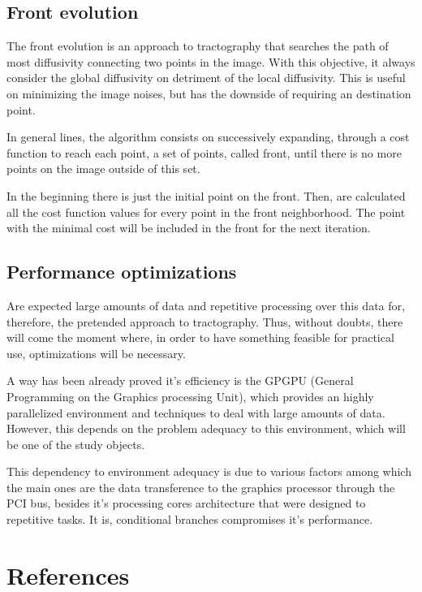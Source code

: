 \documentclass[a4paper,11pt]{report}
\begin{document}
  \section{Front evolution}
  The front evolution is an approach to tractography that searches the path of most diffusivity connecting two points in the image. With this objective, it always consider the global diffusivity on detriment of the local diffusivity. This is useful on minimizing the image noises, but has the downside of requiring an destination point.

  In general lines, the algorithm consists on successively expanding, through a cost function to reach each point, a set of points, called front, until there is no more points on the image outside of this set.

  In the beginning there is just the initial point on the front. Then, are calculated all the cost function values for every point in the front neighborhood. The point with the minimal cost will be included in the front for the next iteration.

  \section{Performance optimizations}
  Are expected large amounts of data and repetitive processing over this data for, therefore, the pretended approach to tractography. Thus, without doubts, there will come the moment where, in order to have something feasible for practical use, optimizations will be necessary.

  A way has been already proved it's efficiency is the GPGPU (General Programming on the Graphics processing Unit), which provides an highly parallelized environment and techniques to deal with large amounts of data. However, this depends on the problem adequacy to this environment, which will be one of the study objects.

  This dependency to environment adequacy is due to various factors among which the main ones are the data transference to the graphics processor through the PCI bus, besides it's processing cores architecture that were designed to repetitive tasks. It is, conditional branches compromises it's performance.

\chapter{References} \label{ch: biblio}
\end{document}
